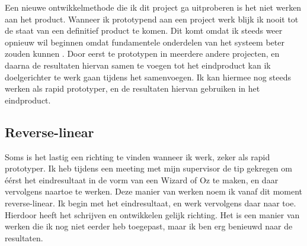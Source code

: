 Een nieuwe ontwikkelmethode die ik dit project ga uitproberen is het niet werken aan het product. Wanneer ik prototypend aan een project werk blijk ik nooit tot de staat van een definitief product te komen. Dit komt omdat ik steeds weer opnieuw wil beginnen omdat fundamentele onderdelen van het systeem beter zouden kunnen . Door eerst te prototypen in meerdere andere projecten, en daarna de resultaten hiervan samen te voegen tot het eindproduct kan ik doelgerichter te werk gaan tijdens het samenvoegen. Ik kan hiermee nog steeds werken als rapid prototyper, en de resultaten hiervan gebruiken in het eindproduct.

\subsection{Reverse-linear}
Soms is het lastig een richting te vinden wanneer ik werk, zeker als rapid prototyper. Ik heb tijdens een meeting met mijn supervisor de tip gekregen om éérst het eindresultaat in de vorm van een Wizard of Oz  te maken, en daar vervolgens naartoe te werken. Deze manier van werken noem ik vanaf dit moment reverse-linear. Ik begin met het eindresultaat, en werk vervolgens daar naar toe. Hierdoor heeft het schrijven en ontwikkelen gelijk richting. Het is een manier van werken die ik nog niet eerder heb toegepast, maar ik ben erg benieuwd naar de resultaten.


